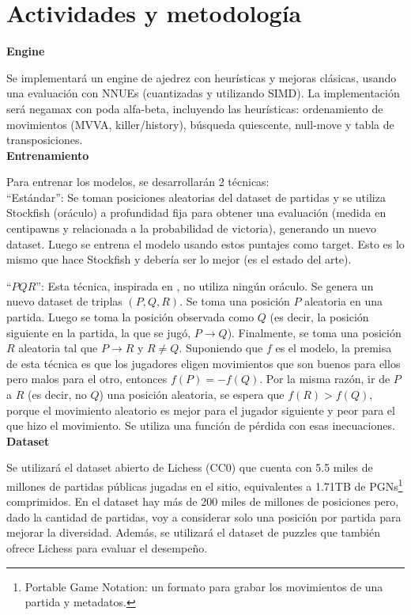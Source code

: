 \newpage
\section*{Actividades y metodología}

\textbf{Engine}

Se implementará un engine de ajedrez con heurísticas y mejoras clásicas, usando una evaluación con NNUEs (cuantizadas y utilizando SIMD). La implementación será negamax con poda alfa-beta, incluyendo las heurísticas: ordenamiento de movimientos (MVVA, killer/history), búsqueda quiescente, null-move y tabla de transposiciones. \\

\textbf{Entrenamiento}

Para entrenar los modelos, se desarrollarán 2 técnicas: \\

``Estándar'': Se toman posiciones aleatorias del dataset de partidas y se utiliza Stockfish (oráculo) a profundidad fija para obtener una evaluación (medida en centipawns y relacionada a la probabilidad de victoria), generando un nuevo dataset. Luego se entrena el modelo usando estos puntajes como target. Esto es lo mismo que hace Stockfish y debería ser lo mejor (es el estado del arte).

``$PQR$'': Esta técnica, inspirada en \cite{dlchess:2014}, no utiliza ningún oráculo. Se genera un nuevo dataset de triplas $(P,Q,R)$. Se toma una posición $P$ aleatoria en una partida. Luego se toma la posición observada como $Q$ (es decir, la posición siguiente en la partida, la que se jugó, $P \rightarrow Q$). Finalmente, se toma una posición $R$ aleatoria tal que $P \rightarrow R$ y $R \neq Q$. Suponiendo que $f$ es el modelo, la premisa de esta técnica es que los jugadores eligen movimientos que son buenos para ellos pero malos para el otro, entonces $f(P)=-f(Q)$. Por la misma razón, ir de $P$ a $R$ (es decir, no $Q$) una posición aleatoria, se espera que $f(R) > f(Q)$, porque el movimiento aleatorio es mejor para el jugador siguiente y peor para el que hizo el movimiento. Se utiliza una función de pérdida con esas inecuaciones. \\


\textbf{Dataset}

Se utilizará el dataset abierto de Lichess \cite{lichessdb} (CC0) que cuenta con 5.5 miles de millones de partidas públicas jugadas en el sitio, equivalentes a 1.71TB de PGNs\footnote[1]{Portable Game Notation: un formato para grabar los movimientos de una partida y metadatos.} comprimidos. En el dataset hay más de 200 miles de millones de posiciones pero, dado la cantidad de partidas, voy a considerar solo una posición por partida para mejorar la diversidad. Además, se utilizará el dataset de puzzles que también ofrece Lichess para evaluar el desempeño.


